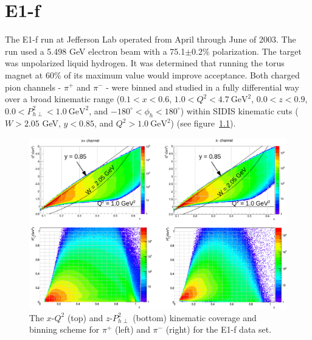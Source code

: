 \chapter{E1-f}
\label{cha:E1f}

The E1-f run at Jefferson Lab operated from April through June of 2003.
The run used a 5.498 GeV electron beam with a 75.1$\pm$0.2\% polarization.
The target was unpolarized liquid hydrogen.
It was determined that running the torus magnet at 60\% of its maximum value would improve acceptance.
Both charged pion channels - $\pi^+$ and $\pi^-$ - were binned and studied in a fully differential way over a broad kinematic range ($0.1 < x < 0.6$, $1.0 < Q^2 < 4.7\ \text{GeV}^2$, $0.0 < z < 0.9$, $0.0 < P_{h\perp}^2 < 1.0\ \text{GeV}^2$, and $-180^\circ < \phi_h < 180^\circ$) within SIDIS kinematic cuts ($W > 2.05$ GeV, $y < 0.85$, and $Q^2 > 1.0\ \text{GeV}^2$) (see figure~\ref{fig:binningScheme}).
\begin{figure}[htp]
\centering
\includegraphics[width=4.5in]{figures/binningScheme.png}
\caption{The $x$-$Q^2$ (top) and $z$-$P_{h\perp}^2$ (bottom) kinematic coverage and binning scheme for $\pi^+$ (left) and $\pi^-$ (right) for the E1-f data set.}
\label{fig:binningScheme}
\end{figure}



